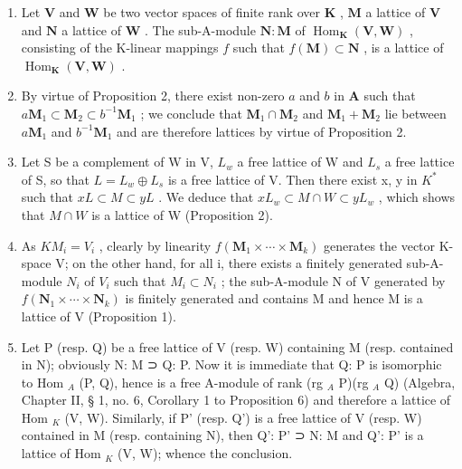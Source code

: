 \begin{enumerate}
\def\labelenumi{(\roman{enumi})}
\setcounter{enumi}{3}
\item
  Let \(\mathbf{V}\) and \(\mathbf{W}\) be two vector spaces of finite rank over \(\mathbf{K}\) , \(\mathbf{M}\) a lattice of \(\mathbf{V}\) and \(\mathbf{N}\) a lattice of \(\mathbf{W}\) . The sub-A-module \(\mathbf{N}:\mathbf{M}\) of \(\operatorname{Hom}_{\mathbf{K}}(\mathbf{V},\mathbf{W})\) , consisting of the K-linear mappings \(f\) such that \(f(\mathbf{M})\subset \mathbf{N}\) , is a lattice of \(\operatorname{Hom}_{\mathbf{K}}(\mathbf{V},\mathbf{W})\) .
\item
  By virtue of Proposition 2, there exist non-zero \(a\) and \(b\) in \(\mathbf{A}\) such that \(a\mathbf{M}_1 \subset \mathbf{M}_2 \subset b^{-1}\mathbf{M}_1\) ; we conclude that \(\mathbf{M}_1 \cap \mathbf{M}_2\) and \(\mathbf{M}_1 + \mathbf{M}_2\) lie between \(a\mathbf{M}_1\) and \(b^{-1}\mathbf{M}_1\) and are therefore lattices by virtue of Proposition 2.
\item
  Let S be a complement of W in V, \(L_{w}\) a free lattice of W and \(L_{s}\) a free lattice of S, so that \(L = L_{w} \oplus L_{s}\) is a free lattice of V. Then there exist x, y in \(K^{*}\) such that \(xL \subset M \subset yL\) . We deduce that \(xL_{w} \subset M \cap W \subset yL_{w}\) , which shows that \(M \cap W\) is a lattice of W (Proposition 2).
\item
  As \(KM_{i} = V_{i}\) , clearly by linearity \(f(\mathbf{M}_{1} \times \cdots \times \mathbf{M}_{k})\) generates the vector K-space V; on the other hand, for all i, there exists a finitely generated sub-A-module \(N_{i}\) of \(V_{i}\) such that \(M_{i} \subset N_{i}\) ; the sub-A-module N of V generated by \(f(\mathbf{N}_{1} \times \cdots \times \mathbf{N}_{k})\) is finitely generated and contains M and hence M is a lattice of V (Proposition 1).
\item
  Let P (resp. Q) be a free lattice of V (resp. W) containing M (resp. contained in N); obviously N: M ⊃ Q: P. Now it is immediate that Q: P is isomorphic to Hom \(_{A}\) (P, Q), hence is a free A-module of rank (rg \(_{A}\) P)(rg \(_{A}\) Q) (Algebra, Chapter II, § 1, no. 6, Corollary 1 to Proposition 6) and therefore a lattice of Hom \(_{K}\) (V, W). Similarly, if P' (resp. Q') is a free lattice of V (resp. W) contained in M (resp. containing N), then Q': P' ⊃ N: M and Q': P' is a lattice of Hom \(_{K}\) (V, W); whence the conclusion.
\end{enumerate}


